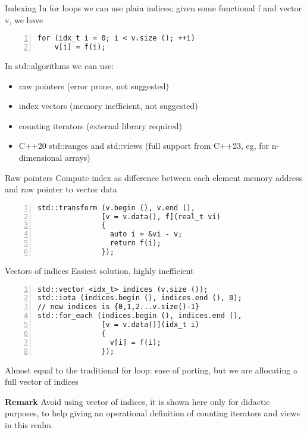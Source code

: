 \documentclass[10pt,aspectratio=169]{beamer}
\begin{document}
\begin{frame}[fragile]{Indexing}
    In for loops we can use plain indices; given some functional {\ttfamily f} and vector v, we have
\begin{lstlisting}[frame=single, style=cpp, firstnumber=1, numbers=left, numberstyle=\tiny,showtabs=false,xleftmargin=.05\linewidth,xrightmargin=.025\linewidth]
for (idx_t i = 0; i < v.size (); ++i) 
    v[i] = f(i);
\end{lstlisting}
 

    \bigskip
    In std::algorithms we can use:
    \begin{itemize}
        \item raw pointers (error prone, not suggested)
        \item index vectors (memory inefficient, not suggested)
        \item counting iterators (external library required)
        \item C++20 std::ranges and std::views (full support from C++23, eg, for n-dimensional arrays)
    \end{itemize}
\end{frame}

\begin{frame}[fragile]{Raw pointers}
Compute index as difference between each element memory address and raw pointer to vector data 

\begin{lstlisting}[frame=single, style=cpp, firstnumber=1, numbers=left, numberstyle=\tiny,showtabs=false,xleftmargin=.05\linewidth,xrightmargin=.025\linewidth]
std::transform (v.begin (), v.end (), 
               [v = v.data(), f](real_t vi) 
               {
                 auto i = &vi - v;
                 return f(i);
               });
\end{lstlisting}

\end{frame}

\begin{frame}[fragile]{Vectors of indices}
Easiest solution, highly inefficient

\begin{lstlisting}[frame=single, style=cpp, firstnumber=1, numbers=left, numberstyle=\tiny,showtabs=false,xleftmargin=.05\linewidth,xrightmargin=.025\linewidth]
std::vector <idx_t> indices (v.size ());
std::iota (indices.begin (), indices.end (), 0); 
// now indices is {0,1,2...v.size()-1}
std::for_each (indices.begin (), indices.end (), 
               [v = v.data()](idx_t i) 
               {
                 v[i] = f(i);
               });
\end{lstlisting}
Almost equal to the traditional for loop: ease of porting, but we are allocating a full vector of indices

\textbf{Remark} Avoid using vector of indices, it is shown here only for didactic purposes, to help giving an operational definition of counting iterators and views in this realm.
\end{frame}
\end{document}
